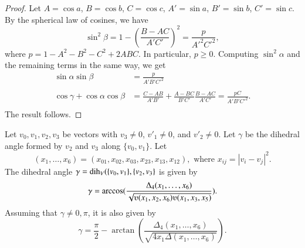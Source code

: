\begin{proof}
Let $A=\cos a$, $B=\cos b$, $C=\cos c$,
$A'=\sin a$, $B'=\sin b$, $C'=\sin c$.  By the
spherical law of cosines, we have
   $$\sin^2\beta = 1-\left(\frac{B-A C}{A' C'}\right)^2
     = \frac{p}{A'^2 C'^2},$$
where $p=1-A^2 - B^2 - C^2 + 2 A B C$.
In particular, $p\ge 0$.
Computing $\sin^2\alpha$ and the remaining terms in the same way, we get
   $$
   \begin{array}{lll}
     \sin\alpha\sin\beta &= \frac{p}{A' B' C'^2}\\ 
      \\
     \cos\gamma + \cos\alpha \cos\beta &=
         \frac{C - A B}{A' B'} + \frac{A - B C}{B' C'} \frac{B - A C}{A' C'}
         = \frac{p C}{A' B' C'^2}.\\
   \end{array}
   $$
The result follows.
\end{proof}




\begin{lemma} \label{lemma:dihform} Let $v_0,v_1,v_2,v_3$ 
be vectors with $v_3\ne0$, $v'_1\ne 0$, and $v'_2 \ne 0$.  
Let $\gamma$ be the dihedral angle formed
by $v_2$ and $v_3$ along $\{v_0,v_1\}$. Let
    $$(x_1,\ldots,x_6) = 
    (x_{01},x_{02},x_{03},x_{23},x_{13},x_{12}),
    \text{ where } x_{ij}=|v_i-v_j|^2.$$
The dihedral angle $\gamma=\operatorname{dih}_V(\{v_0,v_1\},\{v_2,v_3\}$
is given by
    $$
    \gamma=\arccos(\frac{\Delta_4(x_1,\ldots,x_6)}{\sqrt{
    \ups(x_1,x_2,x_6)\ups(x_1,x_3,x_5)}}).
    $$
Assuming that $\gamma\ne 0,\pi$, it is also given by
    $$
    \gamma=\frac{\pi}{2} - \arctan
     (\frac{\Delta_4(x_1,\ldots,x_6)}{\sqrt{4 x_1 \Delta(x_1,\ldots,x_6)}}).
    $$
\end{lemma}

